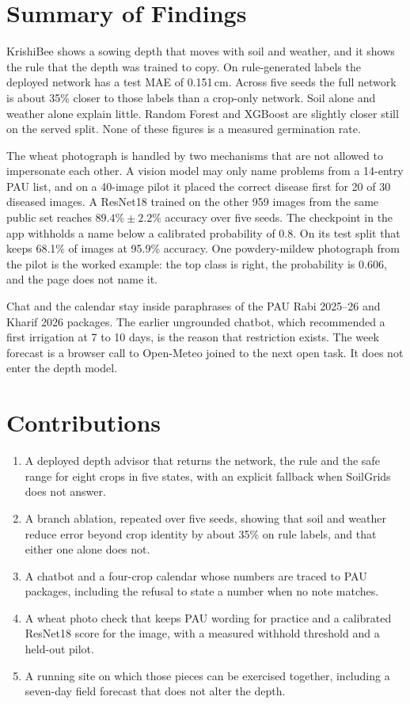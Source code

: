 \label{ch:conclusion}

\section{Summary of Findings}
KrishiBee shows a sowing depth that moves with soil and weather, and it shows the rule that the depth was trained to copy. On rule-generated labels the deployed network has a test MAE of 0.151\,cm. Across five seeds the full network is about 35\% closer to those labels than a crop-only network. Soil alone and weather alone explain little. Random Forest and XGBoost are slightly closer still on the served split. None of these figures is a measured germination rate.

The wheat photograph is handled by two mechanisms that are not allowed to impersonate each other. A vision model may only name problems from a 14-entry PAU list, and on a 40-image pilot it placed the correct disease first for 20 of 30 diseased images. A ResNet18 trained on the other 959 images from the same public set reaches $89.4\% \pm 2.2\%$ accuracy over five seeds. The checkpoint in the app withholds a name below a calibrated probability of 0.8. On its test split that keeps 68.1\% of images at 95.9\% accuracy. One powdery-mildew photograph from the pilot is the worked example: the top class is right, the probability is 0.606, and the page does not name it.

Chat and the calendar stay inside paraphrases of the PAU Rabi 2025--26 and Kharif 2026 packages. The earlier ungrounded chatbot, which recommended a first irrigation at 7 to 10 days, is the reason that restriction exists. The week forecast is a browser call to Open-Meteo joined to the next open task. It does not enter the depth model.

\section{Contributions}
\begin{enumerate}[leftmargin=1.4em]
    \item A deployed depth advisor that returns the network, the rule and the safe range for eight crops in five states, with an explicit fallback when SoilGrids does not answer.
    \item A branch ablation, repeated over five seeds, showing that soil and weather reduce error beyond crop identity by about 35\% on rule labels, and that either one alone does not.
    \item A chatbot and a four-crop calendar whose numbers are traced to PAU packages, including the refusal to state a number when no note matches.
    \item A wheat photo check that keeps PAU wording for practice and a calibrated ResNet18 score for the image, with a measured withhold threshold and a held-out pilot.
    \item A running site on which those pieces can be exercised together, including a seven-day field forecast that does not alter the depth.
\end{enumerate}

